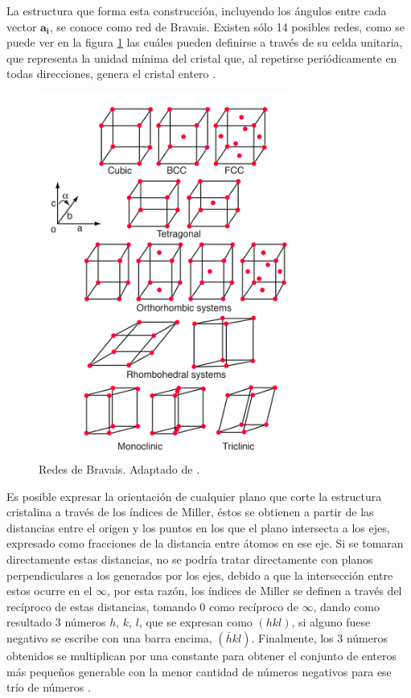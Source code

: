 \documentclass[../main.tex]{subfiles}
\begin{document}
La estructura que forma esta construcción, incluyendo los ángulos entre cada vector $\pmb{a_i}$, se conoce como red de Bravais. Existen sólo 14 posibles redes, como se puede ver en la figura \ref{fig:bravais} las cuáles pueden definirse a través de su celda unitaria, que representa la unidad mínima del cristal que, al repetirse periódicamente en todas direcciones, genera el cristal entero \cite{Ashcroft1976}.
\begin{figure}[H]
    \centering
    \includegraphics[width=0.75\textwidth]{fig/bravais.png}
    \caption{Redes de Bravais. Adaptado de \cite{ScienceFacts2024}.}
    \label{fig:bravais}
\end{figure}
Es posible expresar la orientación de cualquier plano que corte la estructura cristalina a través de los índices de Miller, éstos se obtienen a partir de las distancias entre el origen y los puntos en los que el plano intersecta a los ejes, expresado como fracciones de la distancia entre átomos en ese eje. Si se tomaran directamente estas distancias, no se podría tratar directamente con planos perpendiculares a los generados por los ejes, debido a que la intersección entre estos ocurre en el $\infty$, por esta razón, los índices de Miller se definen a través del recíproco de estas distancias, tomando 0 como recíproco de $\infty$, dando como resultado 3 números $h$, $k$, $l$, que se expresan como $(hkl)$, si alguno fuese negativo se escribe con una barra encima, $\left(\bar{h}kl\right)$. Finalmente, los 3 números obtenidos se multiplican por una constante para obtener el conjunto de enteros más pequeños generable con la menor cantidad de números negativos para ese trío de números \cite{Cullity2014}.
\end{document}
